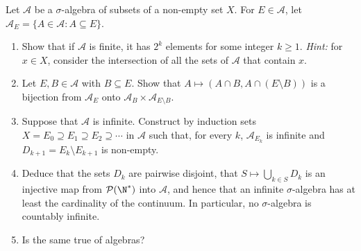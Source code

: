 \begin{exercise}\label{ex:sa-cardinality}
\hard Let $\mathcal A$ be a $\sigma$-algebra of subsets of a non-empty set $X$. For $E\in\mathcal
A$, let $\mathcal A_E=\{A\in\mathcal A:A\subseteq E\}$.
\begin{enumerate}[label=(\alph*)]
  \item Show that if $\mathcal A$ is finite, it has $2^k$ elements for some integer $k\ge1$.
    \emph{Hint:} for $x\in X$, consider the intersection of all the sets of $\mathcal A$ that
    contain $x$.
  \item Let $E,B\in\mathcal A$ with $B\subseteq E$. Show that $A\mapsto(A\cap B,A\cap(E\setminus B))$
    is a bijection from $\mathcal A_E$ onto $\mathcal A_B\times\mathcal A_{E\setminus B}$.
  \item Suppose that $\mathcal A$ is infinite. Construct by induction sets
    $X=E_0\supseteq E_1\supseteq E_2\supseteq\cdots$ in $\mathcal A$ such that, for every $k$,
    $\mathcal A_{E_k}$ is infinite and $D_{k+1}=E_k\setminus E_{k+1}$ is non-empty.
  \item Deduce that the sets $D_k$ are pairwise disjoint, that $S\mapsto\bigcup_{k\in S}D_k$ is an
    injective map from $\mathcal P(\N^*)$ into $\mathcal A$, and hence that an infinite
    $\sigma$-algebra has at least the cardinality of the continuum. In particular, no
    $\sigma$-algebra is countably infinite.
  \item Is the same true of algebras?
\end{enumerate}
\end{exercise}
